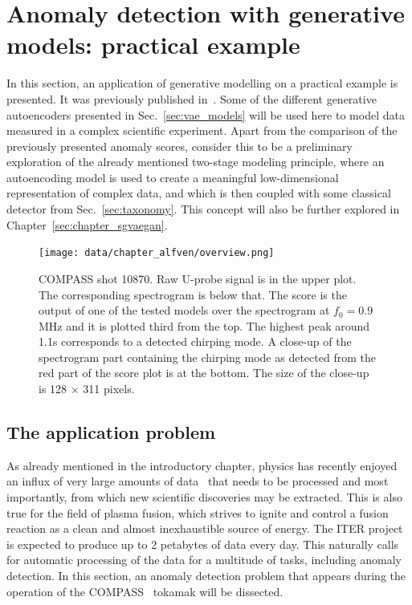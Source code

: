 \section{Anomaly detection with generative models: practical example} \label{sec:alfven}
In this section, an application of generative modelling on a practical example is presented. It was previously published in~\cite{vskvara2020detection}. Some of the different generative autoencoders presented in Sec.~\ref{sec:vae_models} will be used here to model data measured in a complex scientific experiment. Apart from the comparison of the previously presented anomaly scores, consider this to be a preliminary exploration of the already mentioned two-stage modeling principle, where an autoencoding model is used to create a meaningful low-dimensional representation of complex data, and which is then coupled with some classical detector from Sec.~\ref{sec:taxonomy}. This concept will also be further explored in Chapter~\ref{sec:chapter_sgvaegan}.

\begin{figure}[t]%
  \centering
  \texttt{[image: data/chapter\_alfven/overview.png]}
  \caption{COMPASS shot 10870. Raw U-probe signal is in the upper plot. The corresponding spectrogram is below that. The score is the output of one of the tested models over the spectrogram at $f_0=0.9$ MHz and it is plotted third from the top. The highest peak around 1.1s corresponds to a detected chirping mode. A close-up of the spectrogram part containing the chirping mode as detected from the red part of the score plot is at the bottom. The size of the close-up is 128 $\times$ 311 pixels.}
  \label{fig:psd}
\end{figure}

\subsection{The application problem}
As already mentioned in the introductory chapter, physics has recently enjoyed an influx of very large amounts of data~\cite{bird2011computing,ball2010data} that needs to be processed and most importantly, from which new scientific discoveries may be extracted. This is also true for the field of plasma fusion, which strives to ignite and control a fusion reaction as a clean and almost inexhaustible source of energy. The ITER project~\cite{holtkamp2007overview} is expected to produce up to 2 petabytes of data every day. This naturally calls for automatic processing of the data for a multitude of tasks, including anomaly detection. In this section, an anomaly detection problem that appears during the operation of the COMPASS~\cite{panek2015status} tokamak will be dissected.

